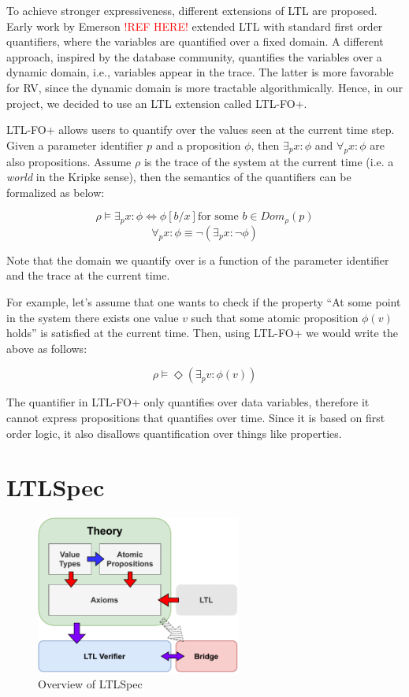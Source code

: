 \documentclass[format=acmsmall, nonacm=true, review=true, screen=true]{acmart}
\newcommand{\mycaption}[1]{\Description{#1}\caption{#1}}
\newcommand{\red}[1]{\textcolor{red}{#1}}
\begin{document}
To achieve stronger expressiveness, different extensions of LTL are proposed. Early work by Emerson \red{!REF HERE!} extended LTL with standard first order quantifiers, where the variables are quantified over a fixed domain. A different approach, inspired by the database community, quantifies the variables over a dynamic domain, i.e., variables appear in the trace. The latter is more favorable for RV, since the dynamic domain is more tractable algorithmically. Hence, in our project, we decided to use an LTL extension called LTL-FO+.

LTL-FO+ allows users to quantify over the values seen at the current time step. Given a parameter identifier $p$ and a proposition $\phi$, then $\exists_{p} x : \phi$ and $\forall_{p} x:\phi$ are also propositions. Assume $\rho$ is the trace of the system at the current time (i.e. a \textit{world} in the Kripke sense), then the semantics of the quantifiers can be formalized as below:

$$\rho\vDash \exists_p x:\phi \Leftrightarrow \phi[b/x] \text{for some }b\in Dom_{\rho}(p)$$
$$\forall_{p} x : \phi \equiv \lnot(\exists_{p}x: \lnot\phi)$$

Note that the domain we quantify over is a function of the parameter identifier and the trace at the current time.

For example, let's assume that one wants to check if the property “At some point in the system there exists one value $v$ such that some atomic proposition $\phi(v)$ holds” is satisfied at the current time. Then, using LTL-FO+ we would write the above as follows:

$$ \rho \vDash \Diamond(\exists_{p} v :\phi(v)) $$

The quantifier in LTL-FO+ only quantifies over data variables, therefore it cannot express propositions that quantifies over time. Since it is based on first order logic, it also disallows quantification over things like properties.

\section{LTLSpec}

\begin{figure}[h]
  \includegraphics[width=0.6\textwidth]{images/ltlspec-overview.pdf}
  \centering
  \mycaption{Overview of LTLSpec}
  \label{fig:overview}
\end{figure}
\end{document}
